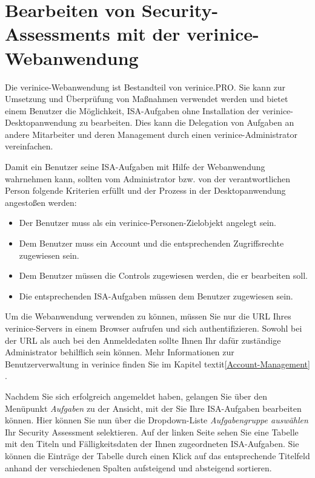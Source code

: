 \documentclass[a4paper,10pt]{book}
\begin{document}
\section{Bearbeiten von Security-Assessments mit der verinice-Webanwendung}
\label{bearbeiten-von-security-assessments-mit-der-verinice-webanwendung}

Die verinice-Webanwendung ist Bestandteil von verinice.PRO. Sie kann zur
Umsetzung und Überprüfung von Maßnahmen verwendet werden und bietet einem
Benutzer die Möglichkeit, ISA-Aufgaben ohne Installation der
verinice-Desktopanwendung zu bearbeiten. Dies kann die Delegation von Aufgaben
an andere Mitarbeiter und deren Management durch einen verinice-Administrator
vereinfachen.

Damit ein Benutzer seine ISA-Aufgaben mit Hilfe der Webanwendung wahrnehmen
kann, sollten vom Administrator bzw. von der verantwortlichen Person folgende
Kriterien erfüllt und der Prozess in der Desktopanwendung angestoßen werden:

\begin{itemize}
 \item Der Benutzer muss als ein verinice-Personen-Zielobjekt angelegt sein.
 \item Dem Benutzer muss ein Account und die entsprechenden Zugriffsrechte
 zugewiesen sein.
 \item Dem Benutzer müssen die Controls zugewiesen werden, die er bearbeiten
 soll.
 \item Die entsprechenden ISA-Aufgaben müssen dem Benutzer zugewiesen sein.
\end{itemize}

Um die Webanwendung verwenden zu können, müssen Sie nur die URL Ihres
verinice-Servers in einem Browser aufrufen und sich authentifizieren. Sowohl bei
der URL als auch bei den Anmeldedaten sollte Ihnen Ihr dafür zuständige
Administrator behilflich sein können. Mehr Informationen zur Benutzerverwaltung
in verinice finden Sie im Kapitel {textit{\ref{Account-Management}
}}.

Nachdem Sie sich erfolgreich angemeldet haben, gelangen Sie über den Menüpunkt
\textit{Aufgaben} zu der Ansicht, mit der Sie Ihre ISA-Aufgaben bearbeiten
können. Hier können Sie nun über die Dropdown-Liste \textit{Aufgabengruppe
auswählen} Ihr Security Assessment selektieren. Auf der linken Seite sehen Sie
eine Tabelle mit den Titeln und Fälligkeitsdaten der Ihnen zugeordneten
ISA-Aufgaben. Sie können die Einträge der Tabelle durch einen Klick auf das
entsprechende Titelfeld anhand der verschiedenen Spalten aufsteigend und
absteigend sortieren.
\end{document}
